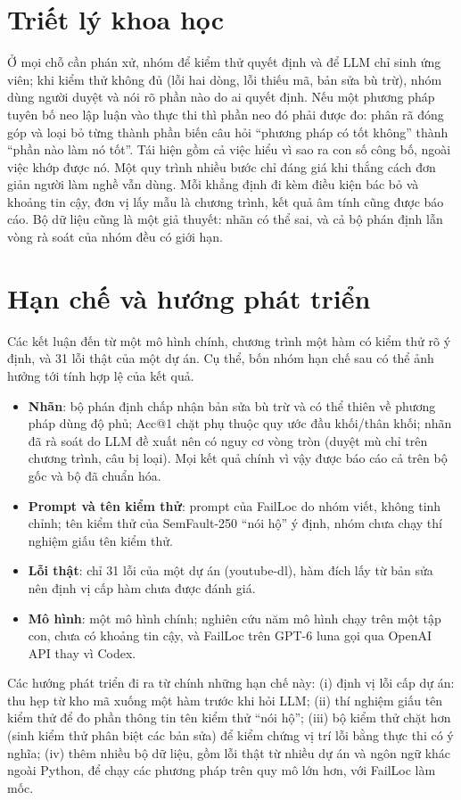 \section{Triết lý khoa học}
\label{sec:triet-ly}

Ở mọi chỗ cần phán xử, nhóm để kiểm thử quyết định và để LLM chỉ sinh ứng viên; khi kiểm thử không đủ (lỗi hai dòng, lỗi
thiếu mã, bản sửa bù trừ), nhóm dùng người duyệt và nói rõ phần nào do ai quyết định. Nếu một phương pháp tuyên bố neo lập
luận vào thực thi thì phần neo đó phải được đo: phân rã đóng góp và loại bỏ từng thành phần biến câu hỏi ``phương pháp có
tốt không'' thành ``phần nào làm nó tốt''. Tái hiện gồm cả việc hiểu vì sao ra con số công bố, ngoài việc khớp được nó. Một quy
trình nhiều bước chỉ đáng giá khi thắng cách đơn giản người làm nghề vẫn dùng. Mỗi khẳng định đi kèm điều kiện bác bỏ và
khoảng tin cậy, đơn vị lấy mẫu là chương trình, kết quả âm tính cũng được báo cáo. Bộ dữ liệu cũng là một giả thuyết: nhãn
có thể sai, và cả bộ phán định lẫn vòng rà soát của nhóm đều có giới hạn.

\section{Hạn chế và hướng phát triển}
\label{sec:moi-de-doa}\label{sec:huong-phat-trien}

Các kết luận đến từ một mô hình chính, chương trình một hàm có kiểm thử rõ ý định, và 31 lỗi thật của một dự án. Cụ thể,
bốn nhóm hạn chế sau có thể ảnh hưởng tới tính hợp lệ của kết quả.

\begin{itemize}
\item \textbf{Nhãn}: bộ phán định chấp nhận bản sửa bù trừ và có thể thiên về phương pháp dùng độ phủ; Acc@1 chặt phụ thuộc
  quy ước đầu khối/thân khối; nhãn đã rà soát do LLM đề xuất nên có nguy cơ vòng tròn (duyệt mù chỉ trên
  \BlindBlindAllPrograms{} chương trình, \BlindAnswersExcluded{} câu bị loại). Mọi kết quả chính vì vậy được báo cáo cả
  trên bộ gốc và bộ đã chuẩn hóa.
\item \textbf{Prompt và tên kiểm thử}: prompt của FailLoc do nhóm viết, không tinh chỉnh; tên kiểm thử của SemFault-250
  ``nói hộ'' ý định, nhóm chưa chạy thí nghiệm giấu tên kiểm thử.
\item \textbf{Lỗi thật}: chỉ 31 lỗi của một dự án (youtube-dl), hàm đích lấy từ bản sửa nên định vị cấp hàm chưa được đánh giá.
\item \textbf{Mô hình}: một mô hình chính; nghiên cứu năm mô hình chạy trên một tập con, chưa có khoảng tin cậy, và
  FailLoc trên GPT-6 luna gọi qua OpenAI API thay vì Codex.
\end{itemize}

Các hướng phát triển đi ra từ chính những hạn chế này: (i) định vị lỗi cấp dự án: thu hẹp từ kho mã xuống một hàm trước khi hỏi LLM; (ii) thí nghiệm giấu tên kiểm thử để đo phần
thông tin tên kiểm thử ``nói hộ''; (iii) bộ kiểm thử chặt hơn (sinh kiểm thử phân biệt các bản sửa) để kiểm chứng vị trí lỗi
bằng thực thi có ý nghĩa; (iv) thêm nhiều bộ dữ liệu, gồm lỗi thật từ nhiều dự án và ngôn ngữ khác ngoài Python, để chạy các phương pháp trên quy mô
lớn hơn, với FailLoc làm mốc.
